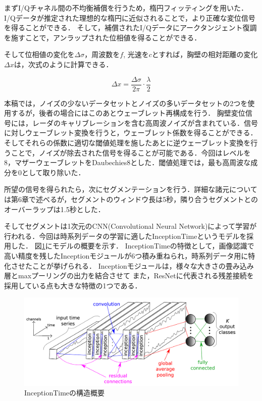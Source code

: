 まずI/Qチャネル間の不均衡補償を行うため，楕円フィッティングを用いた．I/Qデータが推定された理想的な楕円に近似されることで，より正確な変位信号を得ることができる\cite{paper:ellipse1}\cite{paper:ellipse2}．
そして，補償されたI/Qデータにアークタンジェント復調を施すことで，アンラップされた位相値を得ることができる．

そして位相値の変化を$\Delta \sigma$，周波数を$f$, 光速を$c$とすれば，胸壁の相対距離の変化$\Delta x$は，次式のように計算できる．

\begin{equation}
	\Delta x = \frac{\Delta \sigma}{2 \pi} \cdot \frac{\lambda}{2}
	\end{equation}

本稿では，ノイズの少ないデータセットとノイズの多いデータセットの2つを使用するが，後者の場合にはこのあとウェーブレット再構成を行う．
胸壁変位信号には，レーダのキャリブレーションを含む高周波ノイズが含まれている．信号に対しウェーブレット変換を行うと，ウェーブレット係数を得ることができる．そしてそれらの係数に適切な閾値処理を施したあとに逆ウェーブレット変換を行うことで，ノイズが除去された信号を得ることが可能である．今回はレベルを8，マザーウェーブレットをDaubechies8とした．閾値処理では，最も高周波な成分を0として取り除いた．

所望の信号を得られたら，次にセグメンテーションを行う．詳細な諸元については第6章で述べるが，セグメントのウィンドウ長は5秒，隣り合うセグメントとのオーバーラップは1.5秒とした．

そしてセグメントは1次元のCNN(Convolutional Neural Network)によって学習が行われる．今回は時系列データの学習に適したInceptionTime\cite{paper:InceptionTime}というモデルを採用した．
図\ref{fig:InceptionTime}にモデルの概要を示す．
InceptionTimeの特徴として，画像認識で高い精度を残したInceptionモジュール\cite{paper:Inception}が6つ積み重ねられ，時系列データ用に特化させたことが挙げられる．
Inceptionモジュールは，様々な大きさの畳み込み層とmaxプーリングの出力を結合させて
また，ResNet\cite{paper:ResNet}に代表される残差接続を採用している点も大きな特徴の1つである．

\begin{figure}[H]
\begin{center}
\includegraphics[width=\linewidth]{./fig/InceptionTime.png}
\end{center}
\caption{InceptionTimeの構造概要}
\label{fig:InceptionTime}
\end{figure}

